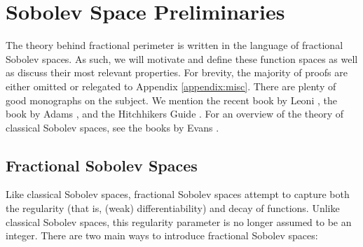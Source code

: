 \documentclass[../main.tex]{subfiles}
\begin{document}
\section{Sobolev Space Preliminaries}


The theory behind fractional perimeter is written in the language of fractional Sobolev spaces. As such, we will motivate and define these function spaces as well as discuss their most relevant properties. For brevity, the majority of proofs are either omitted or relegated to Appendix \ref{appendix:misc}. There are plenty of good monographs on the subject. We mention the recent book by Leoni \cite{leoni:sobolev}, the book by Adams \cite{adams:sobolev}, and the Hitchhikers Guide \cite{hitchhiker}. For an overview of the theory of classical Sobolev spaces, see the books by Evans \cite{evans:pde, evans:gmt}.


\subsection{Fractional Sobolev Spaces}


Like classical Sobolev spaces, fractional Sobolev spaces attempt to capture both the regularity (that is, (weak) differentiability) and decay of functions. Unlike classical Sobolev spaces, this regularity parameter is no longer assumed to be an integer. There are two main ways to introduce fractional Sobolev spaces:
\end{document}
